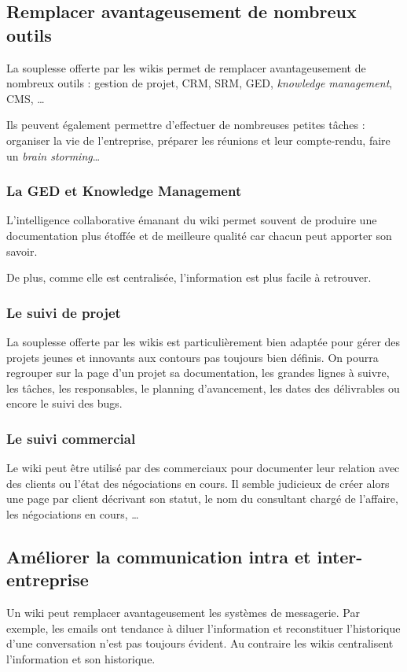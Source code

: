 \documentclass[pdftex,a4paper,11pt]{article}
\begin{document}
\subsection{Remplacer avantageusement de nombreux outils}
La souplesse offerte par les wikis permet de remplacer avantageusement de nombreux outils : gestion de projet, CRM, SRM, GED, \emph{knowledge management}, CMS, \dots

Ils peuvent également permettre d'effectuer de nombreuses petites tâches : organiser la vie de l'entreprise, préparer les réunions et leur compte-rendu, faire un \emph{brain storming}\dots

\subsubsection{La GED et Knowledge Management}
L'intelligence collaborative émanant du wiki permet souvent de produire une documentation plus étoffée et de meilleure qualité car chacun peut apporter son savoir.

De plus, comme elle est centralisée, l'information est plus facile à retrouver.

\subsubsection{Le suivi de projet}
La souplesse offerte par les wikis est particulièrement bien adaptée pour gérer des projets jeunes et innovants aux contours pas toujours bien définis. On pourra regrouper sur la page d'un projet sa documentation, les grandes lignes à suivre, les tâches, les responsables, le planning d'avancement, les dates des délivrables ou encore le suivi des bugs.

\subsubsection{Le suivi commercial}
Le wiki peut être utilisé par des commerciaux pour documenter leur relation avec des clients ou l'état des négociations en cours. Il semble judicieux de créer alors une page par client décrivant son statut, le nom du consultant chargé de l'affaire, les négociations en cours, \dots

\subsection{Améliorer la communication intra et inter-entreprise}
Un wiki peut remplacer avantageusement les systèmes de messagerie. Par exemple, les emails ont tendance à diluer l'information et reconstituer l'historique d'une conversation n'est pas toujours évident. Au contraire les wikis centralisent l'information et son historique.
\end{document}
